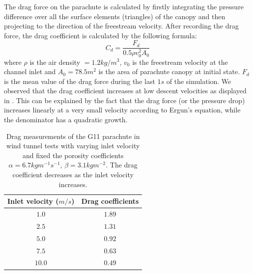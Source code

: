 The drag force on the parachute is calculated by firstly integrating 
the pressure difference over all the surface elements (triangles) of the canopy 
and then projecting to the direction of the freestream velocity. After recording 
the drag force, the drag coefficient is calculated by the following formula: 
\begin{equation} 
C_d = \frac{F_d}{0.5\rho v^2_0A_0}
\label{eq:drag_coeff} 
\end{equation} 
where $\rho$ is the air density $= 1.2kg/m^3$, $v_0$ is the freestream velocity 
at the channel inlet and $A_0 = 78.5m^2$ is the area of parachute canopy at initial 
state. $F_d$ is the mean value of the drag force during the last $1s$ of the 
simulation. We observed that the drag coefficient increases at low descent velocities 
as displayed in . This can be explained by the fact that the drag 
force (or the pressure drop) increases linearly at a very small velocity according to 
Ergun's equation, while the denominator has a quadratic growth.  

\begin{table}[H]
\centering
\begin{tabular}{cc}
\hline\hline
Inlet velocity ($m/s$) & Drag coefficients \\
\hline
$1.0$   & $1.89$ \\ 
$2.5$ & $1.31$ \\
$5.0$   & $0.92$ \\
$7.5$ & $0.63$ \\
$10.0$  & $0.49$\\
\hline
\end{tabular}
\caption{Drag measurements of the G11 parachute in wind tunnel tests
with varying inlet velocity and fixed the porosity coefficients 
$\alpha = 6.7kgm^{-1}s^{-1}$, $\beta = 3.1kgm^{-2}$.  
The drag coefficient decreases as the inlet velocity increases.}
\label{table:drag_coeff} \end{table}

